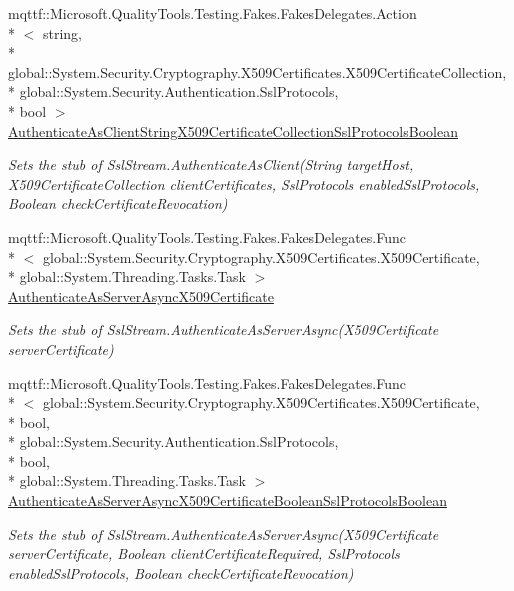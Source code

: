 \begin{DoxyCompactItemize}
mqttf\-::\-Microsoft.\-Quality\-Tools.\-Testing.\-Fakes.\-Fakes\-Delegates.\-Action\\*
$<$ string, \\*
global\-::\-System.\-Security.\-Cryptography.\-X509\-Certificates.\-X509\-Certificate\-Collection, \\*
global\-::\-System.\-Security.\-Authentication.\-Ssl\-Protocols, \\*
bool $>$ \hyperlink{class_system_1_1_net_1_1_security_1_1_fakes_1_1_stub_ssl_stream_a08b5114caf51c0a9c93df57bf2c68f02}{Authenticate\-As\-Client\-String\-X509\-Certificate\-Collection\-Ssl\-Protocols\-Boolean}
\begin{DoxyCompactList}\small\item\em Sets the stub of Ssl\-Stream.\-Authenticate\-As\-Client(\-String target\-Host, X509\-Certificate\-Collection client\-Certificates, Ssl\-Protocols enabled\-Ssl\-Protocols, Boolean check\-Certificate\-Revocation)\end{DoxyCompactList}\item 
mqttf\-::\-Microsoft.\-Quality\-Tools.\-Testing.\-Fakes.\-Fakes\-Delegates.\-Func\\*
$<$ global\-::\-System.\-Security.\-Cryptography.\-X509\-Certificates.\-X509\-Certificate, \\*
global\-::\-System.\-Threading.\-Tasks.\-Task $>$ \hyperlink{class_system_1_1_net_1_1_security_1_1_fakes_1_1_stub_ssl_stream_a3856c1c3262d242418ce5dfbe2dc477d}{Authenticate\-As\-Server\-Async\-X509\-Certificate}
\begin{DoxyCompactList}\small\item\em Sets the stub of Ssl\-Stream.\-Authenticate\-As\-Server\-Async(\-X509\-Certificate server\-Certificate)\end{DoxyCompactList}\item 
mqttf\-::\-Microsoft.\-Quality\-Tools.\-Testing.\-Fakes.\-Fakes\-Delegates.\-Func\\*
$<$ global\-::\-System.\-Security.\-Cryptography.\-X509\-Certificates.\-X509\-Certificate, \\*
bool, \\*
global\-::\-System.\-Security.\-Authentication.\-Ssl\-Protocols, \\*
bool, \\*
global\-::\-System.\-Threading.\-Tasks.\-Task $>$ \hyperlink{class_system_1_1_net_1_1_security_1_1_fakes_1_1_stub_ssl_stream_a6567d32116005f9e1afaf07c2e1388c7}{Authenticate\-As\-Server\-Async\-X509\-Certificate\-Boolean\-Ssl\-Protocols\-Boolean}
\begin{DoxyCompactList}\small\item\em Sets the stub of Ssl\-Stream.\-Authenticate\-As\-Server\-Async(\-X509\-Certificate server\-Certificate, Boolean client\-Certificate\-Required, Ssl\-Protocols enabled\-Ssl\-Protocols, Boolean check\-Certificate\-Revocation)\end{DoxyCompactList}\item 

\end{DoxyCompactItemize}
